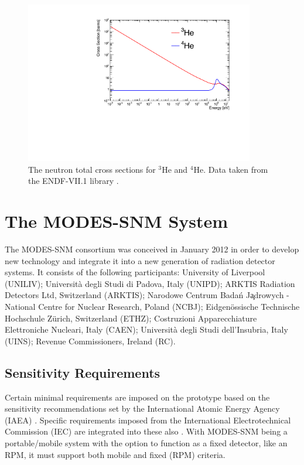 \begin{figure}[htbp]
\begin{center}
\includegraphics[width=100mm]{Chapter5/figures/neutronHeliumTotalXSec.pdf}
\caption{The neutron total cross sections for $^{3}$He and $^{4}$He. Data taken from the ENDF-VII.1 library \cite{endfLibrary}.}
\label{fig:heliumCrossSection}
\end{center}
\end{figure}


\section{The MODES-SNM System}
The MODES-SNM consortium was conceived in January 2012 in order to develop new technology and integrate it into a new generation of radiation detector systems. It consists of the following participants: University of Liverpool (UNILIV); Universit\`{a} degli Studi di Padova, Italy (UNIPD); ARKTIS Radiation Detectors Ltd, Switzerland (ARKTIS); Narodowe Centrum Bada\'{n} J\c{a}drowych - National Centre for Nuclear Research, Poland (NCBJ); Eidgen\"{o}ssische Technische Hochschule Z\"{u}rich, Switzerland (ETHZ); Costruzioni Apparecchiature Elettroniche Nucleari, Italy (CAEN); Universit\`{a} degli Studi dell'Insubria, Italy (UINS); Revenue Commissioners, Ireland (RC). 

\subsection{Sensitivity Requirements}
Certain minimal requirements are imposed on the prototype based on the sensitivity recommendations set by the International Atomic Energy Agency (IAEA) \cite{modesIAEABorder}. Specific requirements imposed from the International Electrotechnical Commission (IEC) are integrated into these also \cite{IEC62244}. With MODES-SNM being a portable/mobile system with the option to function as a fixed detector, like an RPM, it must support both mobile and fixed (RPM) criteria.

